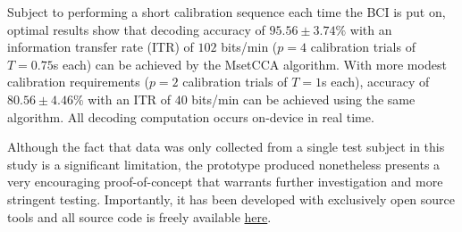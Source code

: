 \noindent
Subject to performing a short calibration sequence each time the BCI is put on, optimal results show that decoding accuracy of $95.56 \pm 3.74\%$ with an information transfer rate (ITR) of $102$ bits/min ($p=4$ calibration trials of $T=0.75$s each) can be achieved by the MsetCCA algorithm. With more modest calibration requirements ($p=2$ calibration trials of $T=1$s each), accuracy of $80.56 \pm 4.46\%$ with an ITR of $40$ bits/min can be achieved using the same algorithm. All decoding computation occurs on-device in real time. 
\vspace{0.4cm}

\noindent
Although the fact that data was only collected from a single test subject in this study is a significant limitation, the prototype produced nonetheless presents a very encouraging proof-of-concept that warrants further investigation and more stringent testing. Importantly, it has been developed with exclusively open source tools and all source code is freely available \href{https://github.com/JamesTev/EEG-decoding}{here}.



